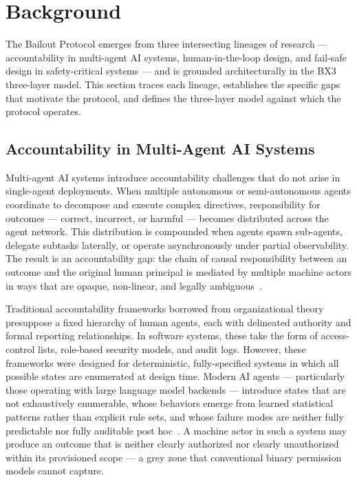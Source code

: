 \section{Background}
\label{sec:background}

The Bailout Protocol emerges from three intersecting lineages of research --- accountability in multi-agent AI systems, human-in-the-loop design, and fail-safe design in safety-critical systems --- and is grounded architecturally in the BX3 three-layer model. This section traces each lineage, establishes the specific gaps that motivate the protocol, and defines the three-layer model against which the protocol operates.

\subsection{Accountability in Multi-Agent AI Systems}
\label{sec:accountability}

Multi-agent AI systems introduce accountability challenges that do not arise in single-agent deployments. When multiple autonomous or semi-autonomous agents coordinate to decompose and execute complex directives, responsibility for outcomes --- correct, incorrect, or harmful --- becomes distributed across the agent network. This distribution is compounded when agents spawn sub-agents, delegate subtasks laterally, or operate asynchronously under partial observability. The result is an accountability gap: the chain of causal responsibility between an outcome and the original human principal is mediated by multiple machine actors in ways that are opaque, non-linear, and legally ambiguous~\cite{bansal2019}.

Traditional accountability frameworks borrowed from organizational theory presuppose a fixed hierarchy of human agents, each with delineated authority and formal reporting relationships. In software systems, these take the form of access-control lists, role-based security models, and audit logs. However, these frameworks were designed for deterministic, fully-specified systems in which all possible states are enumerated at design time. Modern AI agents --- particularly those operating with large language model backends --- introduce states that are not exhaustively enumerable, whose behaviors emerge from learned statistical patterns rather than explicit rule sets, and whose failure modes are neither fully predictable nor fully auditable post hoc~\cite{dijkstra1982}. A machine actor in such a system may produce an outcome that is neither clearly authorized nor clearly unauthorized within its provisioned scope --- a grey zone that conventional binary permission models cannot capture.

